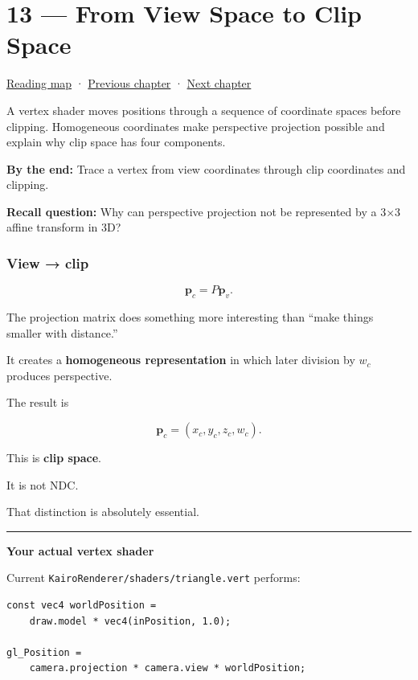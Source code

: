 \hypertarget{03-visual-computing-i-ch013}{}
\chapter{13 --- From View Space to Clip Space}\label{03-visual-computing-i-ch013-from-view-space-to-clip-space}

\hyperref[volume-reading-map]{Reading map} · \hyperref[03-visual-computing-i-ch012]{Previous chapter} · \hyperref[03-visual-computing-i-ch014]{Next chapter}

A vertex shader moves positions through a sequence of coordinate spaces before clipping. Homogeneous coordinates make perspective projection possible and explain why clip space has four components.

\textbf{By the end:} Trace a vertex from view coordinates through clip coordinates and clipping.

\textbf{Recall question:} Why can perspective projection not be represented by a 3×3 affine transform in 3D?

\subsection{View → clip}\label{03-visual-computing-i-ch013-view-clip}

\[
\mathbf p_c=P\mathbf p_v.
\]

The projection matrix does something more interesting than ``make things smaller with distance.''

It creates a \textbf{homogeneous representation} in which later division by \(w_c\) produces perspective.

The result is

\[
\mathbf p_c=
(x_c,y_c,z_c,w_c).
\]

This is \textbf{clip space}.

It is not NDC.

That distinction is absolutely essential.

\begin{center}\rule{0.5\linewidth}{0.5pt}\end{center}

\textbf{Your actual vertex shader}

Current \texttt{KairoRenderer/shaders/triangle.vert} performs:

\begin{verbatim}
const vec4 worldPosition =
    draw.model * vec4(inPosition, 1.0);

gl_Position =
    camera.projection * camera.view * worldPosition;
\end{verbatim}

